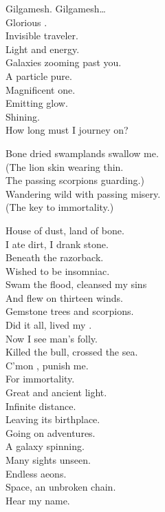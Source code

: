Gilgamesh. Gilgamesh… \\

Glorious . \\
Invisible traveler. \\
Light and energy. \\
Galaxies zooming past you. \\
A particle pure. \\
Magnificent one. \\
Emitting glow. \\
Shining. \\
How long must I journey on? \\


Bone dried swamplands swallow me. \\
(The lion skin wearing thin. \\
The passing scorpions guarding.) \\
Wandering wild with passing misery. \\
(The key to immortality.) \\


House of dust, land of bone. \\
I ate dirt, I drank stone. \\
Beneath the razorback. \\
Wished to be insomniac. \\
Swam the flood, cleansed my sins \\
And flew on thirteen winds. \\
Gemstone trees and scorpions. \\
Did it all, lived my . \\
Now I see man's folly. \\
Killed the bull, crossed the sea. \\
C'mon , punish me. \\
For immortality. \\

Great and ancient light. \\
Infinite distance. \\
Leaving its birthplace. \\
Going on adventures. \\
A galaxy spinning. \\
Many sights unseen. \\
Endless aeons. \\
Space, an unbroken chain. \\
Hear my name. \\

